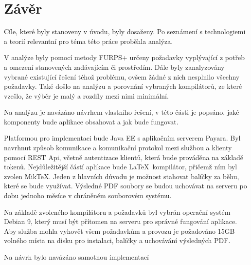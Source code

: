 \chapter{Závěr}

Cíle, které byly stanoveny v úvodu, byly dosaženy. Po seznámení s technologiemi a teorií relevantní pro téma této práce proběhla analýza. 
\par
V analýze byly pomocí metody FURPS+ určeny požadavky vyplývající z potřeb a omezení stanovených zadávajícím či prostředím. Dále byly zanalyzovány vybrané existující řešení téhož problému, ovšem žádné z nich nesplnilo všechny požadavky. Také došlo na analýzu a porovnání vybraných kompilátorů, ze které vzešlo, že výběr je malý a rozdíly mezi nimi minimální.  
\par
Na analýzu je navázáno návrhem vlastního řešení, v této části je popsáno, jaké komponenty bude aplikace obsahovat a jak bude fungovat. 
\par
Platformou pro implementaci bude Java EE s aplikačním serverem Payara. Byl navrhnut způsob komunikace a komunikační protokol mezi službou a klienty pomocí REST Api, včetně autentizace klientů, která bude prováděna na základě tokenů. Nejdůležitější částí aplikace bude \LaTeX\ kompilátor, přičemž ním byl zvolen MikTeX. Jeden z hlavních důvodu je možnost stahovat balíčky za běhu, které se bude využívat. Výsledné PDF soubory se budou uchovávat na serveru po dobu jednoho měsíce v chráněném souborovém systému. 
\par
Na základě zvoleného kompilátoru a požadavků byl vybrán operační systém Debian 9, který musí být přítomen na serveru pro správné fungování aplikace. Aby služba mohla vyhovět všem požadavkům a provozu je požadováno 15GB volného místa na disku pro instalaci, balíčky a uchovávání výsledných PDF.
\par
Na návrh bylo navázáno samotnou implementací 
 